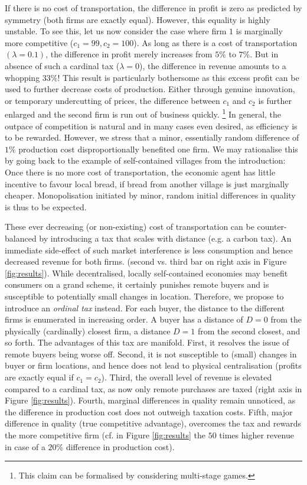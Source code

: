 \documentclass[final,5p,times,twocolumn,11pt,authoryear]{elsarticle}
\numberwithin{equation}{section} %
\begin{document}
If there is no cost of transportation, the difference in profit is zero as predicted by symmetry (both firms are exactly equal).
However, this equality is highly unstable. 
To see this, let us now consider the case where firm $1$ is marginally more competitive ($c_1 = 99, c_2 =100$). 
As long as there is a cost of transportation $(\lambda=0.1)$, the difference in profit merely increases from $5\%$ to $7\%$.
But in absence of such a cardinal tax ($\lambda=0$), the difference in revenue amounts to a whopping $33\%$!
This result is particularly bothersome as this excess profit can be used to further decrease costs of production.
Either through genuine innovation, or temporary undercutting of prices, the difference between $c_1$ and $c_2$ is further enlarged and the second firm is run out of business quickly. 
\footnote{
This claim can be formalised by considering multi-stage games.
} 
In general, the outpace of competition is natural and in many cases even desired, as efficiency is to be rewarded. 
However, we stress that a minor, essentially random difference of $1\%$ production cost disproportionally benefited one firm. 
We may rationalise this by going back to the example of self-contained villages from the introduction: 
Once there is no more cost of transportation, the economic agent has little incentive to favour local bread, if bread from another village is just marginally cheaper. 
Monopolisation initiated by minor, random initial differences in quality is thus to be expected. 

These ever decreasing (or non-existing) cost of transportation can be counter-balanced by introducing a tax that scales with distance (e.g. a carbon tax). 
An immediate side-effect of such market interference is less consumption and hence decreased revenue for both firms. (second vs. third bar on right axis in Figure \ref{fig:results}). 
While decentralised, locally self-contained economies may benefit consumers on a grand scheme, it certainly punishes remote buyers and is susceptible to potentially small changes in location. 
Therefore, we propose to introduce an \textit{ordinal tax} instead. 
For each buyer, the distance to the different firms is enumerated in increasing order. 
A buyer has a distance of $D=0$ from the physically (cardinally) closest firm, a distance $D=1$ from the second closest, and so forth. 
The advantages of this tax are manifold. 
First, it resolves the issue of remote buyers being worse off. 
Second, it is not susceptible to (small) changes in buyer or firm locations, and hence does not lead to physical centralisation (profits are exactly equal if $c_1=c_2$). 
Third, the overall level of revenue is elevated compared to a cardinal tax, as now only remote purchases are taxed (right axis in Figure \ref{fig:results}). 
Fourth, marginal differences in quality remain unnoticed, as the difference in production cost does not outweigh taxation costs. 
Fifth, major difference in quality (true competitive advantage), overcomes the tax and rewards the more competitive firm 
(cf. in Figure \ref{fig:results} the $50$ times higher revenue in case of a $20\%$ difference in production cost). 
\end{document}

